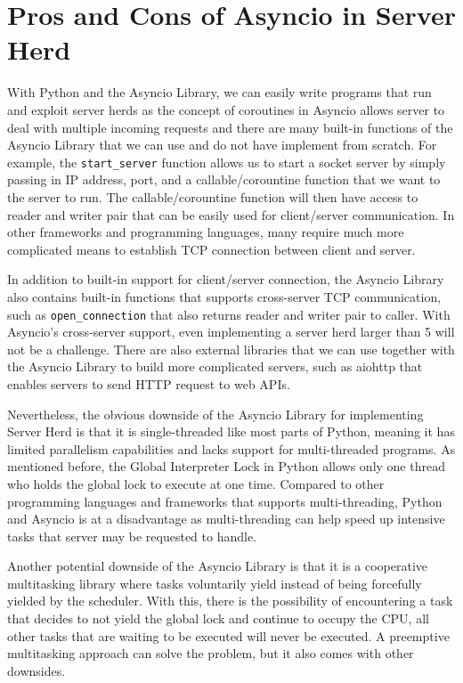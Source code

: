 \section{Pros and Cons of Asyncio in Server Herd}
With Python and the Asyncio Library, we can easily write programs that run and exploit server herds as the concept of coroutines in Asyncio allows server to deal with multiple incoming requests and there are many built-in functions of the Asyncio Library that we can use and do not have implement from scratch. For example, the \texttt{start\_server} function allows us to start a socket server by simply passing in IP address, port, and a callable/corountine function that we want to the server to run. The callable/corountine function will then have access to reader and writer pair that can be easily used for client/server communication. In other frameworks and programming languages, many require much more complicated means to establish TCP connection between client and server. \par
In addition to built-in support for client/server connection, the Asyncio Library also contains built-in functions that supports cross-server TCP communication, such as \texttt{open\_connection} that also returns reader and writer pair to caller. With Asyncio's cross-server support, even implementing a server herd larger than 5 will not be a challenge. There are also external libraries that we can use together with the Asyncio Library to build more complicated servers, such as aiohttp that enables servers to send HTTP request to web APIs. \par
Nevertheless, the obvious downside of the Asyncio Library for implementing Server Herd is that it is single-threaded like most parts of Python, meaning it has limited parallelism capabilities and lacks support for multi-threaded programs. As mentioned before, the Global Interpreter Lock in Python allows only one thread who holds the global lock to execute at one time. Compared to other programming languages and frameworks that supports multi-threading, Python and Asyncio is at a disadvantage as multi-threading can help speed up intensive tasks that server may be requested to handle. \par
Another potential downside of the Asyncio Library is that it is a cooperative multitasking library where tasks voluntarily yield instead of being forcefully yielded by the scheduler. With this, there is the possibility of encountering a task that decides to not yield the global lock and continue to occupy the CPU, all other tasks that are waiting to be executed will never be executed. A preemptive multitasking approach can solve the problem, but it also comes with other downsides. \par
